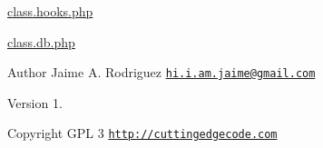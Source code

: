 \begin{DoxyItemize}
\item \hyperlink{class_8hooks_8php}{class.\-hooks.\-php}
\item \hyperlink{class_8db_8php}{class.\-db.\-php}
\end{DoxyItemize}

\begin{DoxyAuthor}{Author}
Jaime A. Rodriguez \href{mailto:hi.i.am.jaime@gmail.com}{\tt hi.\-i.\-am.\-jaime@gmail.\-com} 
\end{DoxyAuthor}
\begin{DoxyVersion}{Version}
1. 
\end{DoxyVersion}
\begin{DoxyCopyright}{Copyright}
G\-P\-L 3 \href{http://cuttingedgecode.com}{\tt http\-://cuttingedgecode.\-com} 
\end{DoxyCopyright}
